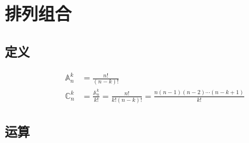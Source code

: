 \section{排列组合}
\subsection{定义}
\begin{align}
\mathbb{A}_n^k &= \frac{n!}{(n-k)!} \\
\mathbb{C}_n^k &= \frac{\mathbb{A}_n^k}{k!} = \frac{n!}{k!(n-k)!}=\frac{n(n-1)(n-2)\cdots(n-k+1)}{k!}
\end{align}
\subsection{运算}
